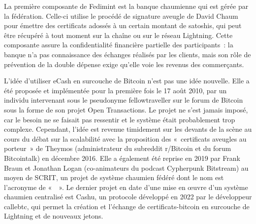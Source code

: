 
La première composante de Fedimint est la banque chaumienne qui est gérée par la fédération. Celle-ci utilise le procédé de signature aveugle de David Chaum pour émettre des certificats adossés à un certain montant de satoshis, qui peut être récupéré à tout moment sur la chaîne ou sur le réseau Lightning. Cette composante assure la confidentialité financière partielle des participants~: la banque n'a pas connaissance des échanges réalisés par les clients, mais son rôle de prévention de la double dépense exige qu'elle voie les revenus des commerçants.

L'idée d'utiliser eCash en surcouche de Bitcoin n'est pas une idée nouvelle. Elle a été proposée et implémentée pour la première fois le 17 août 2010, par un individu intervenant sous le pseudonyme fellowtraveller sur le forum de Bitcoin sous la forme de son projet Open Transactions. Le projet ne s'est jamais imposé, car le besoin ne se faisait pas ressentir et le système était probablement trop complexe. Cependant, l'idée est revenue timidement sur les devants de la scène au cours du débat sur la scalabilité avec la proposition des «~certificats aveugles au porteur~» de Theymos (administrateur du subreddit r/Bitcoin et du forum Bitcointalk) en décembre 2016. Elle a également été reprise en 2019 par Frank Braun et Jonathan Logan (co-animateurs du podcast Cypherpunk Bitstream) au moyen de SCRIT, un projet de système chaumien fédéré dont le nom est l'acronyme de «~~». Le dernier projet en date d'une mise en œuvre d'un système chaumien centralisé est Cashu, un protocole développé en 2022 par le développeur callebtc, qui permet la création et l'échange de certificats-bitcoin en surcouche de Lightning et de nouveaux jetons.

